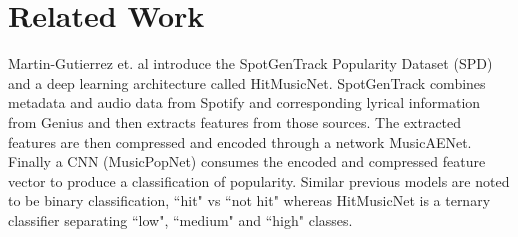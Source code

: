 \documentclass[11pt]{article}
\begin{document}
% 
%
% 


\section{Related Work}

Martin-Gutierrez et. al \cite{martin-gutierrez_multimodal_2020} introduce the SpotGenTrack Popularity Dataset (SPD) and a deep learning architecture called HitMusicNet. SpotGenTrack combines metadata and audio data from Spotify and corresponding lyrical information from Genius and then extracts features from those sources. The extracted features are then compressed and encoded through a network MusicAENet. Finally a CNN (MusicPopNet) consumes the encoded and compressed feature vector to produce a classification of popularity. Similar previous models are noted to be binary classification, ``hit" vs ``not hit" whereas HitMusicNet is a ternary classifier separating ``low", ``medium" and ``high" classes.
\end{document}
